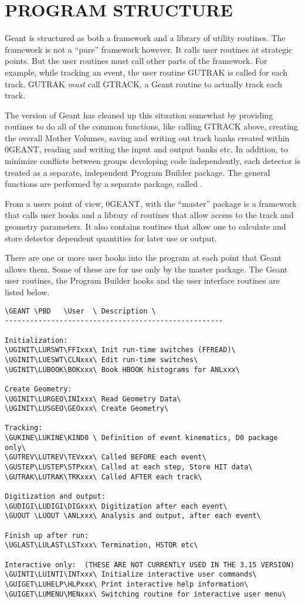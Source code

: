 \section{PROGRAM STRUCTURE}
\label{struct}

Geant is structured as both a framework and a library of utility routines. The
framework is not a ``pure'' framework however. It calls user routines at
strategic points. But the user routines must call other parts of the framework.
For example, while tracking an event, the user routine GUTRAK is called for
each track. GUTRAK {\em must} call GTRACK, a Geant routine to actually track each
track.

The  version of Geant has cleaned up this situation somewhat by providing
routines to do all of the common functions, like calling GTRACK above, creating
the overall Mother Volumes, saving and writing out track banks created within
\D0GEANT, reading and writing the input and output banks etc. In addition, to
minimize conflicts between groups developing code independently, each detector
is treated as a separate, independent Program Builder package. The general
functions are performed by a separate package, called .

From a users point of view, \D0GEANT, with the ``master'' package 
is a framework that calls user hooks and a library of
routines that allow access to the track and geometry parameters. It also
contains routines that allow one to calculate and store detector dependent
quantities for later use or output.

There are one or more user hooks into the program at each point that Geant
allows them. Some of these are for use only by the master package. The Geant
user routines, the Program Builder hooks and the user interface routines are
listed below.

\begin{verbatim}
\GEANT \PBD   \User  \ Description \
----------------------------------------------------

Initialization:
\UGINIT\LURSWT\FFIxxx\ Init run-time switches (FFREAD)\
\UGINIT\LUESWT\CLNxxx\ Edit run-time switches\
\UGINIT\LUBOOK\BOKxxx\ Book HBOOK histograms for ANLxxx\

Create Geometry:
\UGINIT\LURGEO\INIxxx\ Read Geometry Data\
\UGINIT\LUSGEO\GEOxxx\ Create Geometry\

Tracking:
\GUKINE\LUKINE\KIND0 \ Definition of event kinematics, D0 package only\
\GUTREV\LUTREV\TEVxxx\ Called BEFORE each event\
\GUSTEP\LUSTEP\STPxxx\ Called at each step, Store HIT data\
\GUTRAK\LUTRAK\TRKxxx\ Called AFTER each track\

Digitization and output:
\GUDIGI\LUDIGI\DIGxxx\ Digitization after each event\
\GUOUT \LUOUT \ANLxxx\ Analysis and output, after each event\

Finish up after run:
\UGLAST\LULAST\LSTxxx\ Termination, HSTOR etc\

Interactive only:  (THESE ARE NOT CURRENTLY USED IN THE 3.15 VERSION)
\GUINTI\LUINTI\INTxxx\ Initialize interactive user commands\
\GUIGET\LUHELP\HLPxxx\ Print interactive help information\
\GUIGET\LUMENU\MENxxx\ Switching routine for interactive user menu\
\end{verbatim}


